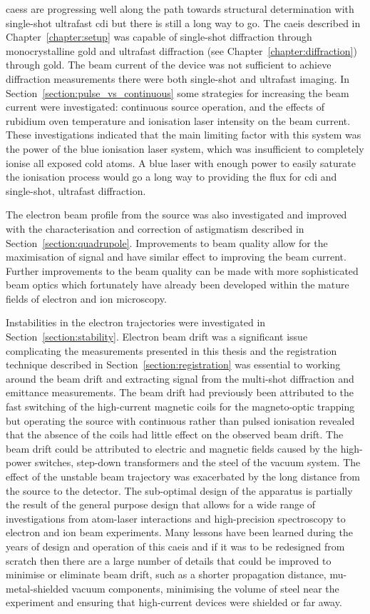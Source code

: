 \Glspl{caes} are progressing well along the path towards structural determination with single-shot ultrafast \gls{cdi} but there is still a long way to go.
The \gls{caeis} described in Chapter~\ref{chapter:setup} was capable of single-shot diffraction through monocrystalline gold and ultrafast diffraction (see Chapter~\ref{chapter:diffraction}) through gold.
The beam current of the device was not sufficient to achieve diffraction measurements there were both single-shot and ultrafast imaging.
In Section~\ref{section:pulse_vs_continuous} some strategies for increasing the beam current were investigated: continuous source operation, and the effects of rubidium oven temperature and ionisation laser intensity on the beam current.
These investigations indicated that the main limiting factor with this system was the power of the blue ionisation laser system, which was insufficient to completely ionise all exposed cold atoms.
A blue laser with enough power to easily saturate the ionisation process would go a long way to providing the flux for \gls{cdi} and single-shot, ultrafast diffraction.

The electron beam profile from the source was also investigated and improved with the characterisation and correction of astigmatism described in Section~\ref{section:quadrupole}.
Improvements to beam quality allow for the maximisation of signal and have similar effect to improving the beam current.
Further improvements to the beam quality can be made with more sophisticated beam optics which fortunately have already been developed within the mature fields of electron and ion microscopy.

Instabilities in the electron trajectories were investigated in Section~\ref{section:stability}.
Electron beam drift was a significant issue complicating the measurements presented in this thesis and the registration technique described in Section~\ref{section:registration} was essential to working around the beam drift and extracting signal from the multi-shot diffraction and emittance measurements.
The beam drift had previously been attributed to the fast switching of the high-current magnetic coils for the magneto-optic trapping but operating the source with continuous rather than pulsed ionisation revealed that the absence of the coils had little effect on the observed beam drift.
The beam drift could be attributed to electric and magnetic fields caused by the high-power switches, step-down transformers and the steel of the vacuum system.
The effect of the unstable beam trajectory was exacerbated by the long distance from the source to the detector.
The sub-optimal design of the apparatus is partially the result of the general purpose design that allows for a wide range of investigations from atom-laser interactions and high-precision spectroscopy to electron and ion beam experiments.
Many lessons have been learned during the years of design and operation of this \gls{caeis} and if it was to be redesigned from scratch then there are a large number of details that could be improved to minimise or eliminate beam drift, such as a shorter propagation distance, mu-metal-shielded vacuum components, minimising the volume of steel near the experiment and ensuring that high-current devices were shielded or far away.

